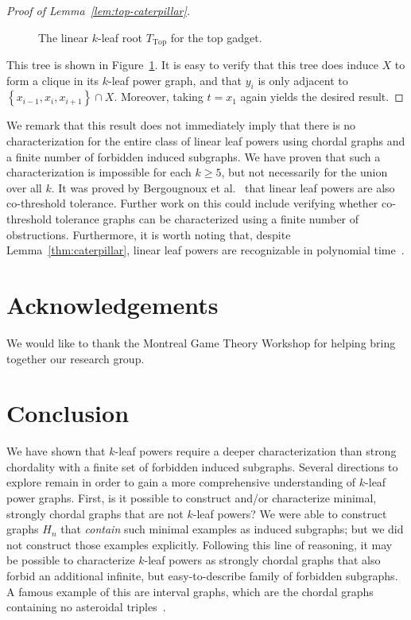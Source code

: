 \documentclass[11pt,letter]{article}
\theoremstyle{remark}
\newcommand{\T}{\text{Top}}
\newcommand{\set}[1]{\left\{#1\right\}}
\begin{document}
\begin{proof}[Proof of Lemma~\ref{lem:top-caterpillar}]
\begin{figure}[h!]
        \caption{The linear $k$-leaf root $T_{\T}$ for the top gadget.}
        \label{fig:caterpilar-Leaf-Root}
    \end{figure}
    This tree is shown in Figure~\ref{fig:caterpilar-Leaf-Root}.
    It is easy to verify that this tree does induce $X$ to form a clique in its $k$-leaf power graph, and that $y_i$ is only adjacent to $\set{x_{i-1},x_i,x_{i+1}}\cap X$. Moreover, taking $t = x_1$ again yields the desired result.
\end{proof}
We remark that this result does not immediately imply that there is no characterization for the entire class of linear leaf powers using chordal graphs and a finite number of forbidden induced subgraphs.
We have proven that such a characterization is impossible for each $k\geq 5$, but not necessarily for the union over all $k$. It was proved by Bergougnoux et al.~\cite{Bergougnoux} that linear leaf powers are also co-threshold tolerance. Further work on this could include verifying whether co-threshold tolerance graphs can be characterized using a finite number of obstructions.
Furthermore, it is worth noting that, despite Lemma~\ref{thm:caterpillar}, linear leaf powers are recognizable in polynomial time~\cite{Bergougnoux}. 

\section{Acknowledgements}

We would like to thank the Montreal Game Theory Workshop for helping bring together our research group.


\section{Conclusion}
We have shown that $k$-leaf powers require a deeper characterization than strong chordality with a finite set of forbidden induced subgraphs. Several directions  to explore remain in order to gain a more comprehensive understanding of $k$-leaf power graphs.
First, is it possible to construct and/or characterize minimal, strongly chordal graphs that are not $k$-leaf powers?  We were able to construct graphs $H_n$ that \emph{contain} such minimal examples as induced subgraphs; but we did not construct those examples explicitly.
Following this line of reasoning, it may be possible to characterize $k$-leaf powers as strongly chordal graphs that also forbid an additional infinite, but easy-to-describe family of forbidden subgraphs. A famous example of this are interval graphs, which are the chordal graphs containing no asteroidal triples~\cite{LB62}.
\end{document}
